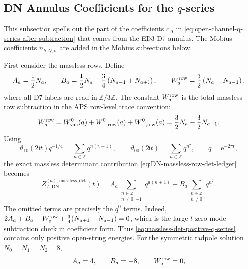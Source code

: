 \documentclass[11pt]{article}
\newcommand{\Z}{\mathbb{Z}}
\newcommand{\wt}{\widetilde}
\newcommand{\vac}{\mathrm{vac}}
\newcommand{\DN}{\mathrm{DN}}
\newcommand{\ii}{\mathrm{i}}
\newcommand{\e}{\mathrm{e}}
\newcommand{\vart}{\vartheta}
\begin{document}
\subsection{DN Annulus Coefficients for the \texorpdfstring{$q$}{q}-series}

This subsection spells out the part of the coefficients \(c_\Delta\) in
\eqref{eq:open-channel-q-series-after-subtraction} that comes from the ED3-D7 annulus. The
Mobius coefficients \(\wt n_{h,Q,\sigma}\) are added in the Mobius subsections below.

First consider the massless rows. Define
\begin{equation}
  A_a=\frac12N_a,
  \qquad
  B_a=
  \frac12N_a-\frac34\left(N_{a-1}+N_{a+1}\right),
  \qquad
  W_a^{\rm row}=\frac32\left(N_a-N_{a-1}\right),
  \label{eq:massless-q-series-coefficients-ABW}
\end{equation}
where all D7 labels are read in \(\Z/3\Z\). The constant \(W_a^{\rm row}\) is the total
massless row subtraction in the APS row-level trace convention:
\begin{equation}
  W_a^{\rm row}
  =
  W_{\vac}^{0}(a)+W_{+,\mathrm{row}}^{0}(a)+W_{-,\mathrm{row}}^{0}(a)
  =
  \frac32N_a-\frac32N_{a-1}.
  \label{eq:total-massless-row-subtraction}
\end{equation}
Using
\begin{equation}
  \vart_{10}(2\ii t)q^{-1/4}
  =
  \sum_{n\in\Z}q^{n(n+1)},
  \qquad
  \vart_{00}(2\ii t)
  =
  \sum_{n\in\Z}q^{n^2},
  \qquad q=\e^{-2\pi t},
  \label{eq:theta-q-series-for-massless-rows}
\end{equation}
the exact massless determinant contribution
\eqref{eq:DN-massless-row-det-ledger} becomes
\begin{equation}
  Z_{A,\DN}^{(a),\mathrm{massless,det}}(t)
  =
  A_a\!\!\sum_{\substack{n\in\Z\\ n\ne0,-1}}\!\!q^{n(n+1)}
  +
  B_a\!\!\sum_{\substack{n\in\Z\\ n\ne0}}\!\!q^{n^2}.
  \label{eq:massless-det-positive-q-series}
\end{equation}
The omitted terms are precisely the \(q^0\) terms. Indeed,
\(2A_a+B_a-W_a^{\rm row}+\frac34(N_{a+1}-N_{a-1})=0\), which is the large-\(t\)
zero-mode subtraction check in coefficient form. Thus
\eqref{eq:massless-det-positive-q-series} contains only positive open-string energies. For the
symmetric tadpole solution \(N_0=N_1=N_2=8\),
\begin{equation}
  A_a=4,\qquad B_a=-8,\qquad W_a^{\rm row}=0,
  \label{eq:symmetric-massless-q-series-coefficients}
\end{equation}
\end{document}
